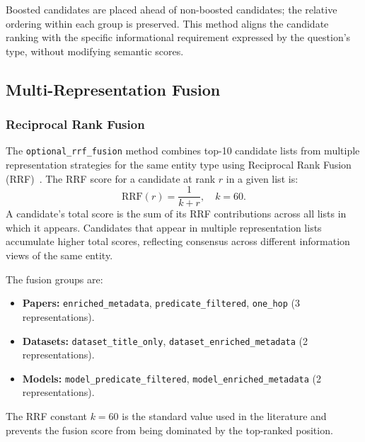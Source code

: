 Boosted candidates are placed ahead of non-boosted candidates; the relative
ordering within each group is preserved.
This method aligns the candidate ranking with the specific informational
requirement expressed by the question's type, without modifying semantic
scores.

\subsection{Multi-Representation Fusion}
\label{subsec:rrf}

\subsubsection{Reciprocal Rank Fusion}
\label{subsubsec:rrf_fusion}

The \texttt{optional\_rrf\_fusion} method combines top-10 candidate lists
from multiple representation strategies for the same entity type using
Reciprocal Rank Fusion (RRF)~.
The RRF score for a candidate at rank $r$ in a given list is:
\[
  \text{RRF}(r) = \frac{1}{k + r}, \quad k = 60.
\]
A candidate's total score is the sum of its RRF contributions across all
lists in which it appears.
Candidates that appear in multiple representation lists accumulate higher
total scores, reflecting consensus across different information views of the
same entity.

The fusion groups are:
\begin{itemize}
  \item \textbf{Papers:} \texttt{enriched\_metadata},
        \texttt{predicate\_filtered}, \texttt{one\_hop} (3 representations).
  \item \textbf{Datasets:} \texttt{dataset\_title\_only},
        \texttt{dataset\_enriched\_metadata} (2 representations).
  \item \textbf{Models:} \texttt{model\_predicate\_filtered},
        \texttt{model\_enriched\_metadata} (2 representations).
\end{itemize}

The RRF constant $k = 60$ is the standard value used in the literature and
prevents the fusion score from being dominated by the top-ranked position.

